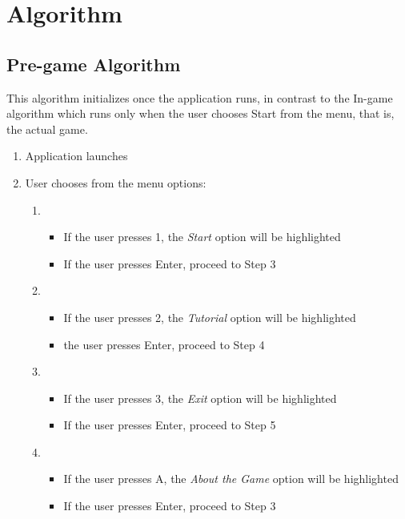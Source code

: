 \section{Algorithm}
\subsection{Pre-game Algorithm}

This algorithm initializes once the application runs, in contrast to the In-game algorithm which runs only when the user chooses Start from the menu, that is, the actual game.

\begin{enumerate}
    \item Application launches
    \item User chooses from the menu options:
    \begin{enumerate}[label=\alph*.]
        \item
            \begin{itemize}[label={}]
                \item If the user presses 1, the \emph{Start} option will be highlighted
                \item \hspace{1cm} If the user presses Enter, proceed to Step 3
            \end{itemize}
        \item 
            \begin{itemize}[label={}]
                \item If the user presses 2, the \emph{Tutorial} option will be highlighted
                \item \hspace{1cm} the user presses Enter, proceed to Step 4
            \end{itemize}
        \item 
            \begin{itemize}[label={}]
                \item  If the user presses 3, the \emph{Exit} option will be highlighted
                \item \hspace{1cm} If the user presses Enter, proceed to Step 5
            \end{itemize}
        \item 
            \begin{itemize}[label={}]
                \item  If the user presses A, the \emph{About the Game} option will be highlighted
                \item \hspace{1cm} If the user presses Enter, proceed to Step 3
            \end{itemize}
        

\end{enumerate}
\end{enumerate}
